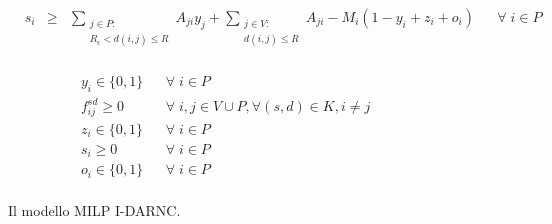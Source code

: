 \begin{figure}
		
		
		\begin{equation} \label{eq:setSlb}
		\begin{array}{rrclcl}
		& s_{i} & \geq & \displaystyle \sum_{\substack{j \in P :\\ R_{\epsilon} < d(i,j) \le R} } A_{ji} y_{j} + \displaystyle \sum_{\substack{j \in V :\\ d(i,j) \le R %
			}}
			A_{ji} - M_i (1 - y_i + z_i + o_i) %
			&& \forall \; i \in P\\
			\end{array}
			\end{equation}
			
			
			
			
			
			
			\begin{equation} \label{eq:vars}
			\begin{array}{rlclcl}	
			& y_i \in \{0, 1\} && \forall \; i \in P \\
			& f^{sd}_{ij} \ge 0 && \forall \; i , j \in V \cup P, \forall (s,d) \in K, i \neq j \\
			& z_i \in \{0, 1\} && \forall \; i \in P \\
			& s_i \ge 0 && \forall \; i \in P \\
			& o_i \in \{0, 1\} && \forall \; i \in P \\
			\end{array}
			\end{equation}
		
		\caption{Il modello MILP I-DARNC.}\label{fig:MILP}
	\end{figure}

